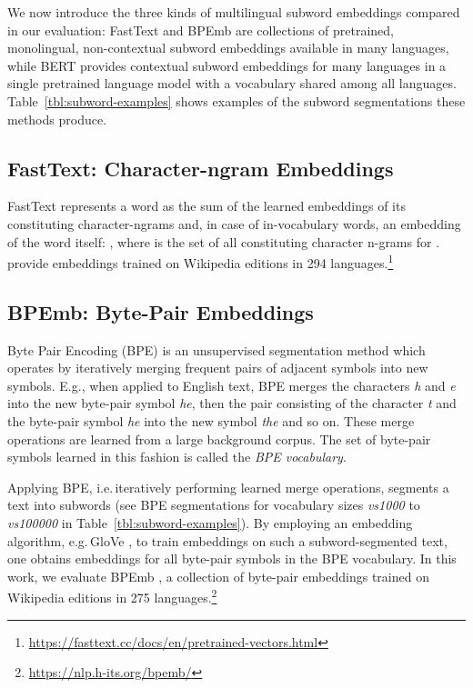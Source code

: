 \documentclass[11pt,a4paper]{article}
\begin{document}
We now introduce the three kinds of multilingual subword embeddings compared in our evaluation: FastText and BPEmb are collections of pretrained, monolingual, non-contextual subword embeddings available in many languages, while BERT provides contextual subword embeddings for many languages in a single pretrained language model with a vocabulary shared among all languages.
Table~\ref{tbl:subword-examples} shows examples of the subword segmentations these methods produce.

\subsection{FastText: Character-ngram Embeddings}

FastText \citep{bojanowski2017subword} represents a word  as the sum of the learned embeddings  of its constituting character-ngrams  and, in case of in-vocabulary words, an embedding  of the word itself: , where  is the set of all constituting character n-grams for .
\citeauthor{bojanowski2017subword} provide embeddings trained on Wikipedia editions in 294 languages.\footnote{\url{https://fasttext.cc/docs/en/pretrained-vectors.html}}

\subsection{BPEmb: Byte-Pair Embeddings}
Byte Pair Encoding (BPE) is an unsupervised segmentation method which operates by iteratively merging frequent pairs of adjacent symbols into new symbols.
E.g., when applied to English text, BPE merges the characters \emph{h} and \emph{e} into the new byte-pair symbol \emph{he}, then the pair consisting of the character \emph{t} and the byte-pair symbol \emph{he} into the new symbol \emph{the} and so on.
These merge operations are learned from a large background corpus.
The set of byte-pair symbols learned in this fashion is called the \emph{BPE vocabulary}.

Applying BPE, i.e.\,iteratively performing learned merge operations, segments a text into subwords (see BPE segmentations for vocabulary sizes \emph{vs1000} to \emph{vs100000} in Table~\ref{tbl:subword-examples}).
By employing an embedding algorithm, e.g.\,GloVe \citep{pennington2014glove}, to train embeddings on such a subword-segmented text, one obtains embeddings for all byte-pair symbols in the BPE vocabulary.
In this work, we evaluate BPEmb \citep{heinzerling2018bpemb}, a collection of byte-pair embeddings trained on Wikipedia editions in 275 languages.\footnote{\url{https://nlp.h-its.org/bpemb/}}
\end{document}

